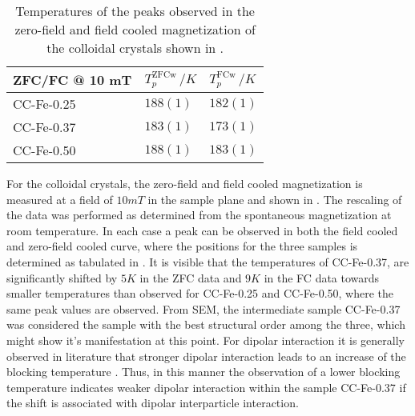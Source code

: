 \documentclass[\main/dresen_thesis.tex]{subfiles}
\begin{document}
    \begin{table}[!htbp]
      \centering
      \caption{\label{tab:colloidalCrystals:ZFCFC:parameters} Temperatures of the peaks observed in the zero-field and field cooled magnetization of the colloidal crystals shown in .}
      \begin{tabular}{ l | l | l}
        \rule{0pt}{2ex} \textbf{ZFC/FC @ 10 mT}
        & $T_p^\mathrm{ZFCw} \, / \unit{K}$
        & $T_p^\mathrm{FCw} \, / \unit{K}$\\
        \hline
        \rule{0pt}{2ex} CC-Fe-0.25    & $188(1)$   & $182(1)$\\
        \rule{0pt}{2ex} CC-Fe-0.37    & $183(1)$   & $173(1)$\\
        \rule{0pt}{2ex} CC-Fe-0.50    & $188(1)$   & $183(1)$\\
        \hline
      \end{tabular}
    \end{table}

    For the colloidal crystals, the zero-field and field cooled magnetization is measured at a field of $10 \unit{mT}$ in the sample plane and shown in .
    The rescaling of the data was performed as determined from the spontaneous magnetization at room temperature.
    In each case a peak can be observed in both the field cooled and zero-field cooled curve, where the positions for the three samples is determined as tabulated in .
    It is visible that the temperatures of CC-Fe-0.37, are significantly shifted by $5 \unit{K}$ in the ZFC data and $9 \unit{K}$ in the FC data towards smaller temperatures than observed for CC-Fe-0.25 and CC-Fe-0.50, where the same peak values are observed.
    From SEM, the intermediate sample CC-Fe-0.37 was considered the sample with the best structural order among the three, which might show it's manifestation at this point.
    For dipolar interaction it is generally observed in literature that stronger dipolar interaction leads to an increase of the blocking temperature \cite{Morup_2010_Magne, Pauly_2012_Sized, Otero_2000_Influ}.
    Thus, in this manner the observation of a lower blocking temperature indicates weaker dipolar interaction within the sample CC-Fe-0.37 if the shift is associated with dipolar interparticle interaction.

\end{document}
